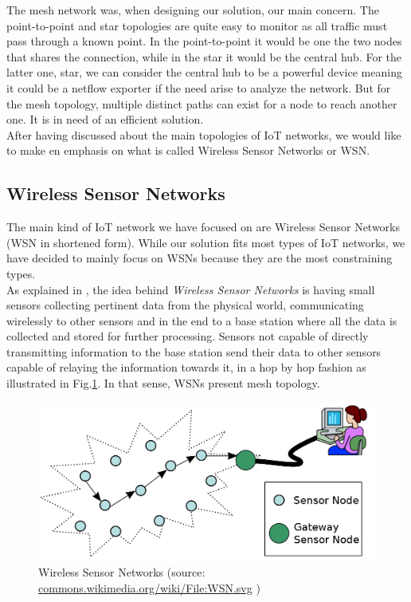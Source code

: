 The mesh network was, when designing our solution, our main concern. The point-to-point and star topologies are quite easy to monitor as all traffic must pass through a known point. In the point-to-point it would be one the two nodes that shares the connection, while in the star it would be the central hub. For the latter one, star, we can consider the central hub to be a powerful device meaning it could be a netflow exporter if the need arise to analyze the network. But for the mesh topology, multiple distinct paths can exist for a node to reach another one. It is in need of an efficient solution. \\

After having discussed about the main topologies of IoT networks, we would like to make en emphasis on what is called Wireless Sensor Networks or WSN.


\subsection*{Wireless Sensor Networks}

The main kind of IoT network we have focused on are Wireless Sensor Networks (WSN in shortened form). While our solution fits most types of IoT networks, we have decided to mainly focus on WSNs because they are the most constraining types.\\

As explained in \cite{vasseur2010interconnecting}, the idea behind \textit{Wireless Sensor Networks} is having small sensors collecting pertinent data from the physical world, communicating wirelessly to other sensors and in the end to a base station where all the data is collected and stored for further processing. Sensors not capable of directly transmitting information to the base station send their data to other sensors capable of relaying the information towards it, in a hop by hop fashion as illustrated in Fig.\ref{fig:wsn}. In that sense, WSNs present mesh topology.\\

\begin{figure}
  \centering
  \includegraphics[width=\textwidth]{res/wsn.png}
  \caption{Wireless Sensor Networks (source: \url{commons.wikimedia.org/wiki/File:WSN.svg} )}
  \label{fig:wsn}
\end{figure}

